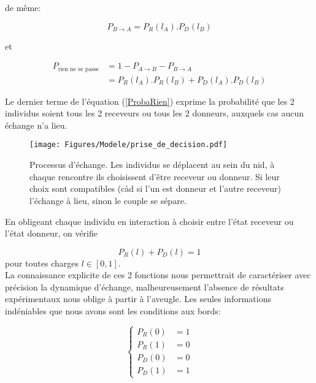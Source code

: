 de même:

\begin{equation}
P_{B \rightarrow A} = P_R(l_A) . P_D(l_B)
\label{ProbaBdonneA}
\end{equation}

et 

\begin{equation}
\begin{aligned}
P_{\text{rien ne se passe}} &= 1- P_{A \rightarrow B} - P_{B \rightarrow A}\\
&= P_R(l_A) . P_R(l_B) + P_D(l_A) . P_D(l_B)
\end{aligned}
\label{ProbaRien}
\end{equation}

Le dernier terme de l'équation (\ref{ProbaRien}) exprime la probabilité que les 2 individus soient tous les 2 receveurs ou tous les 2 donneurs, auxquels cas aucun échange n'a lieu.\\

\begin{figure}[h]
\centering
\texttt{[image: Figures/Modele/prise\_de\_decision.pdf]}
\caption{Processus d'échange. Les individus se déplacent au sein du nid, à chaque rencontre ils choisissent d'être receveur ou donneur. Si leur choix sont compatibles (càd si l'un est donneur et l'autre receveur) l'échange à lieu, sinon le couple se sépare.}
\label{trophallaxie}
\end{figure}

En obligeant chaque individu en interaction à choisir entre l'état receveur ou l'état donneur, on vérifie

\begin{equation}
P_R(l)+P_D(l) = 1
\label{PRPD1}
\end{equation}
pour toutes charges $l\in[0,1]$.\\

La connaissance explicite de ces 2 fonctions nous permettrait de caractériser avec précision la dynamique d'échange, malheureusement l'absence de résultats expérimentaux nous oblige à partir à l'aveugle. Les seules informations indéniables que nous avons sont les conditions aux bords:

\begin{equation}
\left \{
\begin{aligned}
P_R(0)&=1 \\
P_R(1)&=0 \\
P_D(0)&=0 \\
P_D(1)&=1
\end{aligned}
\right.
\label{ConditionsBordsProbabilite}
\end{equation}

